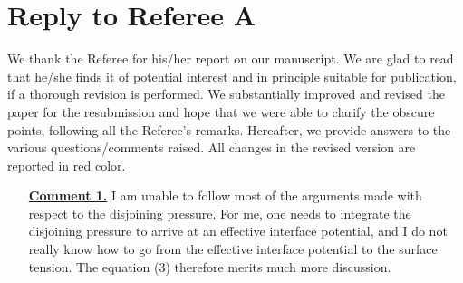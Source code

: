 \documentclass[12pt,english]{article}
\begin{document}

\section*{Reply to Referee A}
We thank the Referee for his/her report on our manuscript. 
We are glad to read that he/she finds it of potential interest and in principle 
suitable for publication, if a thorough revision is performed. 
We substantially improved and revised the paper for the resubmission and hope that we were able to clarify the obscure points, following all the Referee's remarks.
Hereafter, we provide answers to the various questions/comments raised. All changes in the revised version are reported in red color.

\begin{itemize}

\item[ \textbf{\underline{Comment 1.}}]
{ 
I am unable to follow most of the arguments made with respect to the disjoining pressure. 
For me, one needs to integrate the disjoining pressure to arrive at an effective interface potential, and 
I do not really know how to go from the effective interface potential to the surface tension. 
The equation (3) therefore merits much more discussion.
}


\end{itemize}
\end{document}
